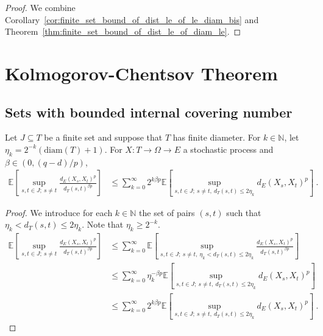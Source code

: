 \begin{proof}
We combine Corollary~\ref{cor:finite_set_bound_of_dist_le_of_le_diam_bis} and Theorem~\ref{thm:finite_set_bound_of_dist_le_of_diam_le}.
\end{proof}




\section{Kolmogorov-Chentsov Theorem}


\subsection{Sets with bounded internal covering number}

\begin{lemma}\label{lem:integral_div_dist_le_sum_integral_dist_le}
  \leanok
Let $J \subseteq T$ be a finite set and suppose that $T$ has finite diameter.
For $k \in \mathbb{N}$, let $\eta_k = 2^{-k}(\mathrm{diam}(T) + 1)$.
For $X : T \to \Omega \to E$ a stochastic process and $\beta \in(0, (q - d)/p)$,
\begin{align*}
  \mathbb{E}\left[ \sup_{s, t \in J;\: s \ne t} \frac{d_E(X_s, X_t)^p}{d_T(s, t)^{\beta p}} \right]
  &\le \sum_{k=0}^\infty 2^{k \beta p} \mathbb{E}\left[ \sup_{s, t \in J;\: s \ne t, \: d_T(s, t) \le 2 \eta_k} d_E(X_s, X_t)^p \right]
  \: .
\end{align*}
\end{lemma}

\begin{proof}
We introduce for each $k \in \mathbb{N}$ the set of pairs $(s, t)$ such that $\eta_k < d_T(s, t) \le 2 \eta_k$.
Note that $\eta_k \ge 2^{-k}$.
\begin{align*}
  \mathbb{E}\left[ \sup_{s, t \in J;\: s \ne t} \frac{d_E(X_s, X_t)^p}{d_T(s, t)^{\beta p}} \right]
  &\le \sum_{k=0}^\infty \mathbb{E}\left[ \sup_{s, t \in J;\: s \ne t, \: \eta_k < d_T(s, t) \le 2 \eta_k} \frac{d_E(X_s, X_t)^p}{d_T(s, t)^{\beta p}} \right]
  \\
  &\le \sum_{k=0}^\infty \eta_k^{-\beta p} \mathbb{E}\left[ \sup_{s, t \in J;\: s \ne t, \: d_T(s, t) \le 2 \eta_k} d_E(X_s, X_t)^p \right]
  \\
  &\le \sum_{k=0}^\infty 2^{k \beta p} \mathbb{E}\left[ \sup_{s, t \in J;\: s \ne t, \: d_T(s, t) \le 2 \eta_k} d_E(X_s, X_t)^p \right]
  \: .
\end{align*}
\end{proof}


